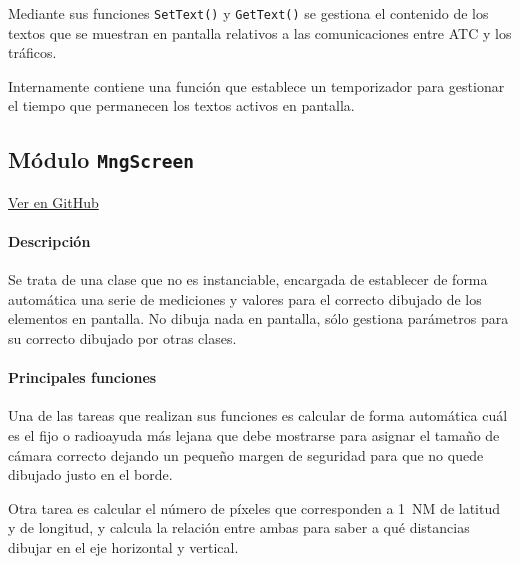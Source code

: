 Mediante sus funciones \texttt{SetText()} y \texttt{GetText()} se gestiona el contenido de los textos que se muestran en pantalla relativos a las comunicaciones entre ATC y los tráficos.

Internamente contiene una función que establece un temporizador para gestionar el tiempo que permanecen los textos activos en pantalla.





\subsection{Módulo \texttt{MngScreen}}
\label{subsec:ClaseMngScreen}

\vspace{-0.85cm}
\begin{flushright}
\href{https://github.com/macgyver912/atc-simulator/blob/jaime/Assets/Scripts/graphics/MngScreen.cs}{Ver en GitHub \faGithub}
\end{flushright}

\paragraph{Descripción} \phantom{\newline}

Se trata de una clase que no es instanciable, encargada de establecer de forma automática una serie de mediciones y valores para el correcto dibujado de los elementos en pantalla. No dibuja nada en pantalla, sólo gestiona parámetros para su correcto dibujado por otras clases.

\paragraph{Principales funciones} \phantom{\newline}

Una de las tareas que realizan sus funciones es calcular de forma automática cuál es el fijo o radioayuda más lejana que debe mostrarse para asignar el tamaño de cámara correcto dejando un pequeño margen de seguridad para que no quede dibujado justo en el borde. 

Otra tarea es calcular el número de píxeles que corresponden a \SI{1}{NM} de latitud y de longitud, y calcula la relación entre ambas para saber a qué distancias dibujar en el eje horizontal y vertical.


